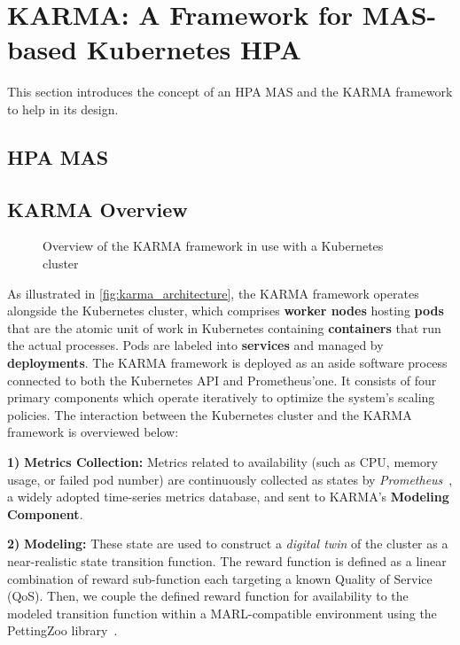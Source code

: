 \documentclass[conference]{IEEEtran}
\begin{document}
\section{KARMA: A Framework for MAS-based Kubernetes HPA}
\label{sec:proposed_approach}

This section introduces the concept of an HPA MAS and the KARMA framework to help in its design.

\subsection{HPA MAS}



\subsection{KARMA Overview}

\begin{figure}[h!]
    \centering
    
    \caption{Overview of the KARMA framework in use with a Kubernetes cluster}
    \label{fig:karma_architecture}
\end{figure}

As illustrated in \autoref{fig:karma_architecture}, the KARMA framework operates alongside the Kubernetes cluster, which comprises \textbf{worker nodes} hosting \textbf{pods} that are the atomic unit of work in Kubernetes containing \textbf{containers} that run the actual processes. Pods are labeled into \textbf{services} and managed by \textbf{deployments}.
%
The KARMA framework is deployed as an aside software process connected to both the Kubernetes API and Prometheus'one. It consists of four primary components which operate iteratively to optimize the system's scaling policies. The interaction between the Kubernetes cluster and the KARMA framework is overviewed below:

\textbf{1)} \textbf{Metrics Collection:} Metrics related to availability (such as CPU, memory usage, or failed pod number) are continuously collected as states by \textit{Prometheus}~\cite{prometheus}, a widely adopted time-series metrics database, and sent to KARMA's \textbf{Modeling Component}.

\textbf{2)} \textbf{Modeling:} These state are used to construct a \textit{digital twin} of the cluster as a near-realistic state transition function. The reward function is defined as a linear combination of reward sub-function each targeting a known Quality of Service (QoS). Then, we couple the defined reward function for availability to the modeled transition function within a MARL-compatible environment using the PettingZoo library~\cite{Terry2021}.
\end{document}
